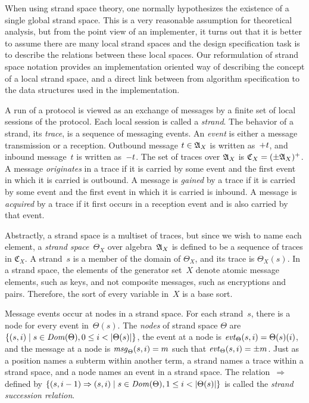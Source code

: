 \documentclass[12pt]{report}
\theoremstyle{definition}
\newcommand{\alga}{\alg{A}}
\newcommand{\tr}{\ensuremath{\mathfrak C}}
\newcommand{\sdom}{\fn{Dom}}
\newcommand{\evt}{\fn{evt}}
\newcommand{\msg}{\fn{msg}}
\begin{document}
When using strand space theory, one normally hypothesizes the
existence of a single global strand space.  This is a very reasonable
assumption for theoretical analysis, but from the point view of an
implementer, it turns out that it is better to assume there are many
local strand spaces and the design specification task is to describe
the relations between these local spaces.  Our reformulation of strand
space notation provides an implementation oriented way of describing
the concept of a local strand space, and a direct link between from
algorithm specification to the data structures used in the
implementation.

A run of a protocol is viewed as an exchange of messages by a finite
set of local sessions of the protocol.  Each local session is called a
\emph{strand}.  The behavior of a strand, its
\emph{trace}, is a sequence of messaging events.  An
\emph{event} is either a message transmission or a
reception.  Outbound message $t\in\alga_X$ is written as~$\mathord + t$,
and inbound message~$t$ is written as~$\mathord - t$.  The set of traces
over $\alga_X$ is $\tr_X=(\pm\alga_X)^+$.  A message
\emph{originates} in a trace if it is carried by
some event and the first event in which it is carried is outbound.  A
message is \emph{gained} by a trace if it is carried by
some event and the first event in which it is carried is inbound.  A
message is \emph{acquired} by a trace if it first
occurs in a reception event and is also carried by that event.

Abstractly, a strand space is a multiset of traces, but since we wish
to name each element, a \emph{strand
  space}~$\Theta_X$ over algebra~$\alga_X$ is defined to be a sequence
of traces in $\tr_X$.  A strand~$s$ is a member of the domain of
$\Theta_X$, and its trace is $\Theta_X(s)$.  In a strand space, the
elements of the generator set~$X$ denote atomic message elements, such
as keys, and not composite messages, such as encryptions and pairs.
\enlargethispage{3ex}
Therefore, the sort of every variable in~$X$ is a base sort.

Message events occur at nodes in a strand space.  For each strand~$s$,
there is a node for every event in~$\Theta(s)$.  The
\emph{nodes} of strand space $\Theta$ are $\{(s,i)\mid
s\in\sdom(\Theta), 0\leq i< |\Theta(s)|\}$, the event at a node is
\index{evt@\evt}$\evt_\Theta(s,i)=\Theta(s)(i)$, and the message at a
node is \index{msg@\msg}$\msg_\Theta(s,i) = m$ such that
$\evt_\Theta(s,i) = \pm m$.  Just as a position names a subterm within
another term, a strand names a trace within a strand space, and a node
names an event in a strand space.  The relation~$\Rightarrow$ defined
by $\{(s,i-1)\Rightarrow(s,i)\mid s\in\sdom(\Theta), 1\leq
i<|\Theta(s)|\}$ is called the \emph{strand
  succession relation}.
\end{document}
